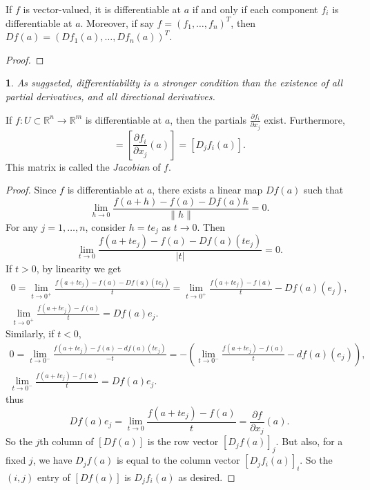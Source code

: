 \documentclass[12pt]{article}
\newtheorem{para}[theorem]{}
\begin{document}
\begin{proposition}
	If $f$ is vector-valued, it is differentiable at $a$ if and only if each component $f_i$ is differentiable at $a$. Moreover, if say $f=(f_1,\dots, f_n)^T$, then $Df(a)=(Df_1(a),\dots, Df_n(a))^T$.
\end{proposition}
\begin{proof}
\end{proof}

\begin{para}
	As suggseted, differentiability is a stronger condition than the existence of all partial derivatives, and all directional derivatives.
\end{para}

\begin{proposition}
	If $f:U\subset\mathbb{R}^n\to\mathbb{R}^m$ is differentiable at $a$, then the partials $\frac{\partial f_i}{\partial x_j}$ exist. Furthermore, 
	\begin{equation*}
		[Df(a)] = \left[\frac{\partial f_i}{\partial x_j}(a)\right] = [D_jf_i(a)].
	\end{equation*}
	This matrix is called the \emph{Jacobian} of $f$.
\end{proposition}
\begin{proof}
	Since $f$ is differentiable at $a$, there exists a linear map $Df(a)$ such that 
	\begin{equation*}
		\lim_{h\to 0}\frac{f(a+h)-f(a)-Df(a)h}{\|h\|} = 0.
	\end{equation*}
	For any $j=1,\dots, n$, consider $h=te_j$ as $t\to 0$. Then 
	\begin{equation*}
		\lim_{t\to 0}\frac{f(a+te_j)-f(a)-Df(a)(te_j)}{|t|} = 0.
	\end{equation*}
	If $t>0$, by linearity we get 
	\begin{gather*}
		0=\lim_{t\to 0^+} \frac{f(a+te_j)-f(a)-Df(a)(te_j)}{t} = \lim_{t\to 0^+}\frac{f(a+te_j)-f(a)}{t}-Df(a)(e_j), \\
		\lim_{t\to 0^+}\frac{f(a+te_j)-f(a)}{t} = Df(a)e_j.
	\end{gather*}
	Similarly, if $t<0$, 
	\begin{gather*}
		0=\lim_{t\to 0^-} \frac{f(a+te_j)-f(a)-df(a)(te_j)}{-t} = -\left( \lim_{t\to 0^-}\frac{f(a+te_j)-f(a)}{t}-df(a)(e_j) \right), \\
		\lim_{t\to 0^-}\frac{f(a+te_j)-f(a)}{t} = Df(a)e_j.
	\end{gather*}
	thus
	\begin{equation*}
		Df(a)e_j = \lim_{t\to 0}\frac{f(a+te_j)-f(a)}{t} = \frac{\partial f}{\partial x_j}(a).
	\end{equation*}
	So the $j$th column of $[Df(a)]$ is the row vector $[D_jf(a)]_j$. But also, for a fixed $j$, we have $D_jf(a)$ is equal to the column vector $[D_jf_i(a)]_i$. So the $(i,j)$ entry of $[Df(a)]$ is $D_jf_i(a)$ as desired.
\end{proof}
\end{document}
